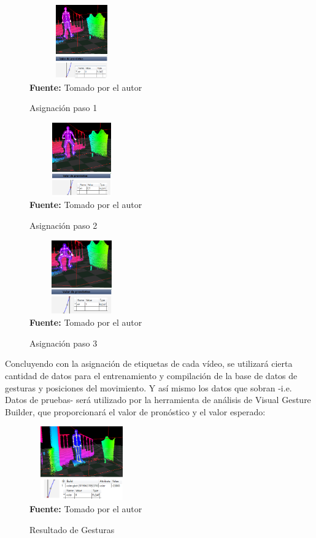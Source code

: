\documentclass[twoside,twocolumn]{article}
\begin{document}
\begin{figure}[H]
	\caption{Asignación paso 1}
	\label{fig:Paso1}
	\centering
	\includegraphics[width=170px,height=120px]{img/paso1.PNG} \\
	\textbf{Fuente:} Tomado por el autor
\end{figure}
\begin{figure}[H]
	\caption{Asignación paso 2}
	\label{fig:Paso2}
	\centering
	\includegraphics[width=170px,height=120px]{img/paso2.PNG} \\
	\textbf{Fuente:} Tomado por el autor
\end{figure}
\medbreak 
\begin{figure}[H]
	\caption{Asignación paso 3}
	\label{fig:Paso3}
	\centering
	\includegraphics[width=170px,height=120px]{img/paso3.PNG} \\
	\textbf{Fuente:} Tomado por el autor
\end{figure}
\medbreak
Concluyendo con la asignación de etiquetas de cada vídeo, se utilizará cierta cantidad de datos para el entrenamiento y compilación de la base de datos de gesturas y posiciones del movimiento. Y así mismo los datos que sobran -i.e. Datos de pruebas- será utilizado por la herramienta de análisis de Visual Gesture Builder, que proporcionará el valor de pronóstico y el valor esperado:
\begin{figure}[H]
	\caption{Resultado de Gesturas}
	\label{fig:resultados}
	\centering
	\includegraphics[width=170px,height=120px]{img/resultado.PNG} \\
	\textbf{Fuente:} Tomado por el autor
\end{figure}
\end{document}
